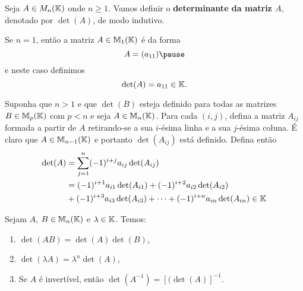 \documentclass{beamer}
\begin{document}
    \begin{frame}
        Seja $A \in M_n(\mathbb{K})$ onde $n \ge 1$. \pause Vamos definir o \textbf{determinante da matriz $A$}, \pause denotado por $\det(A)$, \pause de modo indutivo.\pause

        Se $n = 1$, \pause então a matriz $A \in \mathbb{M}_1(\mathbb{K})$ \pause é da forma
        \[
            A = (a_{11})\pause
        \]
        e neste caso definimos\pause
        \[
            \det(A) = a_{11} \in \mathbb{K}.
        \]
    \end{frame}

\begin{frame}
        Suponha que $n > 1$ \pause e que $\det(B)$ \pause esteja definido para todas as matrizes $B \in \mathbb{M}_p(\mathbb{K})$ \pause com $p < n$ \pause e seja $A \in \mathbb{M}_n(\mathbb{K})$. \pause Para cada $(i,j)$, \pause defina a matriz $A_{ij}$ \pause formada a partir de $A$ \pause retirando-se a sua $i$-ésima linha \pause e a sua $j$-ésima coluna. \pause É claro que $A \in \mathbb{M}_{n - 1}(\mathbb{K})$ \pause e portanto $\det(A_{ij})$ \pause está definido. \pause Defina então\pause
        \begin{align*}
            \det(A) &= \sum_{j = 1}^n(-1)^{i + j}a_{ij}\det(A_{ij}) \\ &= (-1)^{i + 1}a_{i1}\det(A_{i1}) + (-1)^{i + 2}a_{i2}\det(A_{i2}) \\ & + (-1)^{i + 3}a_{i3}\det(A_{i3}) + \cdots + (-1)^{i + n}a_{in}\det(A_{in}) \in \mathbb{K}
        \end{align*}
    \end{frame}

    \begin{frame}
        \begin{proposicao}
            Sejam $A$, $B \in \mathbb{M}_n(\mathbb{K})$ \pause e $\lambda \in \mathbb{K}$. \pause Temos:\pause
            \begin{enumerate}[label={\roman*})]
                \item $\det(AB) = \det(A) \det(B)$,\pause

                \vspace*{1cm}

                \item $\det(\lambda A) = \lambda^n \det(A)$,\pause

                \vspace*{1cm}

                \item Se $A$ é invertível, \pause então $\det(A^{-1}) = [(\det(A)]^{-1}$.
            \end{enumerate}
        \end{proposicao}
    \end{frame}
\end{document}
